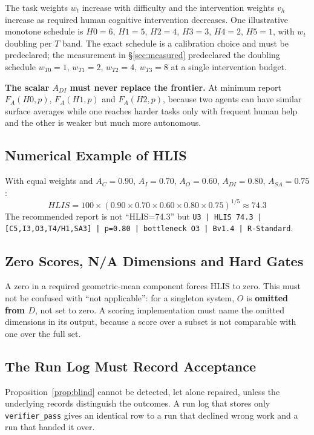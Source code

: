 \sloppy The task weights $w_t$ increase with difficulty and the intervention weights $v_h$ increase as required human cognitive intervention decreases. One illustrative monotone schedule is $H0{=}6$, $H1{=}5$, $H2{=}4$, $H3{=}3$, $H4{=}2$, $H5{=}1$, with $w_t$ doubling per $T$ band. The exact schedule is a calibration choice and must be predeclared; the measurement in \S\ref{sec:measured} predeclared the doubling schedule $w_{T0}{=}1$, $w_{T1}{=}2$, $w_{T2}{=}4$, $w_{T3}{=}8$ at a single intervention budget.

\textbf{The scalar $A_{DI}$ must never replace the frontier.} At minimum report $F_A(H0,p)$, $F_A(H1,p)$ and $F_A(H2,p)$, because two agents can have similar surface averages while one reaches harder tasks only with frequent human help and the other is weaker but much more autonomous.

\subsection{Numerical Example of HLIS}

With equal weights and $A_C=0.90$, $A_I=0.70$, $A_O=0.60$, $A_{DI}=0.80$, $A_{SA}=0.75$:
\begin{equation*}
HLIS = 100 \times (0.90 \times 0.70 \times 0.60 \times 0.80 \times 0.75)^{1/5} \approx 74.3
\end{equation*}
The recommended report is not ``HLIS=74.3'' but
\texttt{U3 | HLIS 74.3 | [C5,I3,O3,T4/H1,SA3] | p=0.80 | bottleneck O3 | Bv1.4 | R-Standard}.

\subsection{Zero Scores, N/A Dimensions and Hard Gates}

A zero in a required geometric-mean component forces HLIS to zero. This must not be confused with ``not applicable'': for a singleton system, $O$ is \textbf{omitted from $D$}, not set to zero. A scoring implementation must name the omitted dimensions in its output, because a score over a subset is not comparable with one over the full set.

\subsection{The Run Log Must Record Acceptance}\label{sec:runlog}

Proposition~\ref{prop:blind} cannot be detected, let alone repaired, unless the underlying records distinguish the outcomes. A run log that stores only \texttt{verifier\_pass} gives an identical row to a run that declined wrong work and a run that handed it over.

